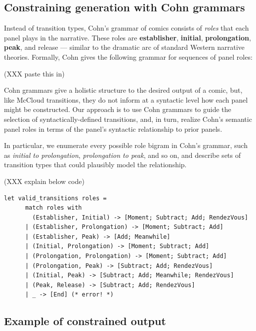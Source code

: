 \subsection{Constraining generation with Cohn grammars}

Instead of transition types, Cohn's grammar of comics consists of {\em
roles} that each panel plays in the narrative. These roles are {\bf
establisher}, {\bf initial}, {\bf prolongation}, {\bf peak}, and {\bf}
release --- similar to the dramatic arc of standard Western narrative
theories. Formally, Cohn gives the following grammar for sequences of panel
roles:

(XXX paste this in)

Cohn grammars give a holistic structure to the desired output of a comic,
but, like McCloud transitions, they do not inform at a syntactic level how
each panel might be constructed. Our approach is to use Cohn grammars to
guide the selection of syntactically-defined transitions, and, in turn,
realize Cohn's semantic panel roles in terms of the panel's syntactic
relationship to prior panels.

In particular, we enumerate every possible role bigram in Cohn's grammar,
such as {\em initial to prolongation}, {\em prolongation to peak}, and so
on, and describe sets of transition types that could plausibly model the
relationship.

(XXX explain below code)

\begin{Verbatim}[fontsize=\small]
let valid_transitions roles =
      match roles with
        (Establisher, Initial) -> [Moment; Subtract; Add; RendezVous]
      | (Establisher, Prolongation) -> [Moment; Subtract; Add]
      | (Establisher, Peak) -> [Add; Meanwhile]
      | (Initial, Prolongation) -> [Moment; Subtract; Add]
      | (Prolongation, Prolongation) -> [Moment; Subtract; Add]
      | (Prolongation, Peak) -> [Subtract; Add; RendezVous]
      | (Initial, Peak) -> [Subtract; Add; Meanwhile; RendezVous]
      | (Peak, Release) -> [Subtract; Add; RendezVous]
      | _ -> [End] (* error! *)
\end{Verbatim}

\subsection{Example of constrained output}




